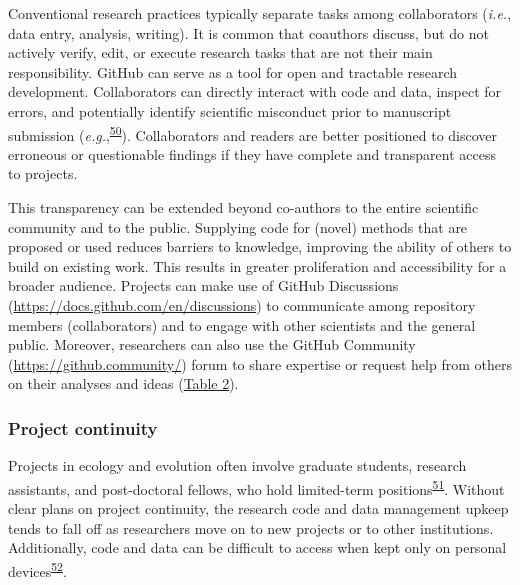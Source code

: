 Conventional research practices typically separate tasks among collaborators (\emph{i.e.}, data entry, analysis, writing).
It is common that coauthors discuss, but do not actively verify, edit, or execute research tasks that are not their main responsibility.
GitHub can serve as a tool for open and tractable research development.
Collaborators can directly interact with code and data, inspect for errors, and potentially identify scientific misconduct prior to manuscript submission (\emph{e.g.},\textsuperscript{\protect\hyperlink{ref-18PTmKJkq}{50}}).
Collaborators and readers are better positioned to discover erroneous or questionable findings if they have complete and transparent access to projects.

This transparency can be extended beyond co-authors to the entire scientific community and to the public.
Supplying code for (novel) methods that are proposed or used reduces barriers to knowledge, improving the ability of others to build on existing work.
This results in greater proliferation and accessibility for a broader audience.
Projects can make use of GitHub Discussions (\url{https://docs.github.com/en/discussions}) to communicate among repository members (collaborators) and to engage with other scientists and the general public.
Moreover, researchers can also use the GitHub Community (\url{https://github.community/}) forum to share expertise or request help from others on their analyses and ideas (\protect\hyperlink{tbl:roles}{Table 2}).

\hypertarget{project-continuity}{%
\subsubsection{Project continuity}\label{project-continuity}}

Projects in ecology and evolution often involve graduate students, research assistants, and post-doctoral fellows, who hold limited-term positions\textsuperscript{\protect\hyperlink{ref-D4C4k4ak}{51}}.
Without clear plans on project continuity, the research code and data management upkeep tends to fall off as researchers move on to new projects or to other institutions.
Additionally, code and data can be difficult to access when kept only on personal devices\textsuperscript{\protect\hyperlink{ref-19kmNxiHc}{52}}.

